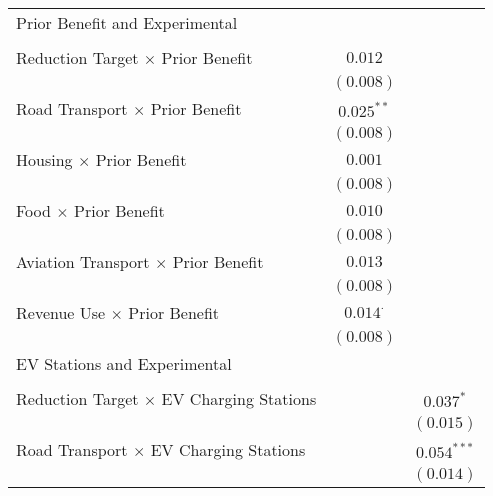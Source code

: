 \begin{center}
\begin{tiny}
\begin{longtable}{l@{} c@{} c@{}}
Prior Benefit and Experimental                         &                  &                  \\
                                                       &                  &                  \\
\quad Reduction Target $\times$ Prior Benefit          & $0.012$          &                  \\
                                                       & $(0.008)$        &                  \\
\quad Road Transport $\times$ Prior Benefit            & $0.025^{**}$     &                  \\
                                                       & $(0.008)$        &                  \\
\quad Housing $\times$ Prior Benefit                   & $0.001$          &                  \\
                                                       & $(0.008)$        &                  \\
\quad Food $\times$ Prior Benefit                      & $0.010$          &                  \\
                                                       & $(0.008)$        &                  \\
\quad Aviation Transport $\times$ Prior Benefit        & $0.013$          &                  \\
                                                       & $(0.008)$        &                  \\
\quad Revenue Use $\times$ Prior Benefit               & $0.014^{\cdot}$  &                  \\
                                                       & $(0.008)$        &                  \\
EV Stations and Experimental                           &                  &                  \\
                                                       &                  &                  \\
\quad Reduction Target $\times$ EV Charging Stations   &                  & $0.037^{*}$      \\
                                                       &                  & $(0.015)$        \\
\quad Road Transport $\times$ EV Charging Stations     &                  & $0.054^{***}$    \\
                                                       &                  & $(0.014)$        \\

\end{longtable}
\end{tiny}
\end{center}
